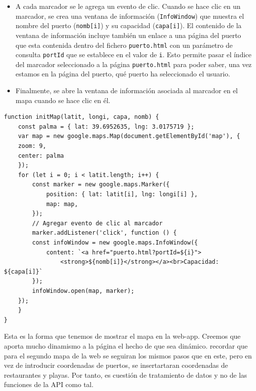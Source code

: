 \documentclass{article}
\begin{document}
\begin{enumerate}
\begin{itemize}
        \item A cada marcador se le agrega un evento de clic. Cuando se hace clic en un marcador, se crea una ventana de información (\texttt{InfoWindow}) que muestra el nombre del puerto (\texttt{nomb[i]}) y su capacidad (\texttt{capa[i]}). El contenido de la ventana de información incluye también un enlace a una página del puerto que esta contenida dentro del fichero \texttt{puerto.html} con un parámetro de consulta \texttt{portId} que se establece en el valor de \texttt{i}. Esto permite pasar el índice del marcador seleccionado a la página \texttt{puerto.html} para poder saber, una vez estamos en la página del puerto, qué puerto ha seleccionado el usuario.
        \item Finalmente, se abre la ventana de información asociada al marcador en el mapa cuando se hace clic en él.
    \end{itemize}
    \begin{verbatim}
function initMap(latit, longi, capa, nomb) {
    const palma = { lat: 39.6952635, lng: 3.0175719 };
    var map = new google.maps.Map(document.getElementById('map'), {
    zoom: 9,
    center: palma
    });
    for (let i = 0; i < latit.length; i++) {
        const marker = new google.maps.Marker({
            position: { lat: latit[i], lng: longi[i] },
            map: map,
        });
        // Agregar evento de clic al marcador
        marker.addListener('click', function () {
        const infoWindow = new google.maps.InfoWindow({
            content: `<a href="puerto.html?portId=${i}">
                <strong>${nomb[i]}</strong></a><br>Capacidad: ${capa[i]}`
        });
        infoWindow.open(map, marker);
    });
    }
}
    \end{verbatim}
\end{enumerate}
Esta es la forma que tenemos de mostrar el mapa en la web-app. Creemos que aporta mucho dinamismo a la página el hecho de que sea dinámico. recordar que para el segundo mapa de la web se seguiran los mismos pasos que en este, pero en vez de introducir coordenadas de puertos, se insertartaran coordenadas de restaurantes y playas. Por tanto, es cuestión de tratamiento de datos y no de las funciones de la API como tal.
\end{document}
